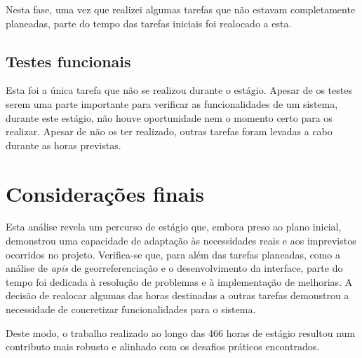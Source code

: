 Nesta fase, uma vez que realizei algumas tarefas que não estavam completamente planeadas, parte do tempo das tarefas iniciais foi realocado a esta.

\vspace{0.5cm}
\subsection{Testes funcionais}
Esta foi a única tarefa que não se realizou durante o estágio. Apesar de os testes serem uma parte importante para verificar as funcionalidades de um sistema, durante este estágio, não houve oportunidade nem o momento certo para os realizar. Apesar de não os ter realizado, outras tarefas foram levadas a cabo durante as horas previstas.

\section{Considerações finais}
Esta análise revela um percurso de estágio que, embora preso ao plano inicial, demonstrou uma capacidade de adaptação às necessidades reais e aos imprevistos ocorridos no projeto. Verifica-se que, para além das tarefas planeadas, como a análise de \textit{\acs{api}s} de georreferenciação e o desenvolvimento da interface, parte do tempo foi dedicada à resolução de problemas e à implementação de melhorias. A decisão de realocar algumas das horas destinadas a outras tarefas demonstrou a necessidade de concretizar funcionalidades para o sistema.

Deste modo, o trabalho realizado ao longo das 466 horas de estágio resultou num contributo mais robusto e alinhado com os desafios práticos encontrados.